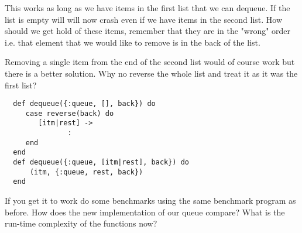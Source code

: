 \documentclass[a4paper,11pt]{article}
\begin{document}
 This works as long as we have items in the first list that we can
 dequeue. If the list is empty will will now crash even if we have
 items in the second list. How should we get hold of these items,
 remember that they are in the "wrong" order i.e. that element that we
 would like to remove is in the back of the list.

 Removing a single item from the end of the second list would of
 course work but there is a better solution. Why no reverse the whole
 list and treat it as it was the first list?

 
 \begin{verbatim}
  def dequeue({:queue, [], back}) do
     case reverse(back) do
        [itm|rest] ->
               :
     end
  end
  def dequeue({:queue, [itm|rest], back}) do
      (itm, {:queue, rest, back})
  end
 \end{verbatim}
   
 If you get it to work do some benchmarks using the same benchmark
 program as before. How does the new implementation of our queue
 compare? What is the run-time complexity of the functions now?


 
\end{document}
